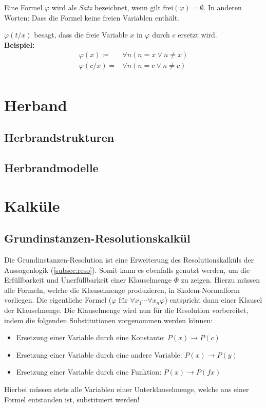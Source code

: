 \begin{description}
			\item[Sätze] Eine Formel $ \varphi $ wird als \textit{Satz} bezeichnet, wenn gilt $ \text{frei}(\varphi) = \emptyset $. In anderen Worten: Dass die Formel keine freien Variablen enthält.
			\item $ \varphi(t / x) $ besagt, dass die freie Variable $ x $ in $ \varphi $ durch $ c $ ersetzt wird. \\
				\textbf{Beispiel:}
				\begin{align*}
					\varphi(x) \coloneqq & \forall n (n = x \lor n \neq x) \\
					\varphi(c / x) =     & \forall n (n = c \lor n \neq c) \\
				\end{align*}
		\end{description}

	\section{Herband}
		\subsection{Herbrandstrukturen}

		\subsection{Herbrandmodelle}

	\section{Kalküle}
		\subsection{Grundinstanzen-Resolutionskalkül}

			Die Grundinstanzen-Resolution ist eine Erweiterung des Resolutionskalküls der Aussagenlogik (\ref{subsec:reso}). Somit kann es ebenfalls genutzt werden, um die Erfüllbarkeit und Unerfüllbarkeit einer Klauselmenge $ \Phi $ zu zeigen. Hierzu müssen alle Formeln, welche die Klauselmenge produzieren, in Skolem-Normalform vorliegen. Die eigentliche Formel ($ \varphi $ für $ \forall x _ 1 \cdots \forall x _ n \varphi $) entspricht dann einer Klausel der Klauselmenge. Die Klauselmenge wird nun für die Resolution vorbereitet, indem die folgenden Substitutionen vorgenommen werden können:
			\begin{itemize}
				\item Ersetzung einer Variable durch eine Konstante: $ P(x) \rightarrow P(c) $
				\item Ersetzung einer Variable durch eine andere Variable: $ P(x) \rightarrow P(y) $
				\item Ersetzung einer Variable durch eine Funktion: $ P(x) \rightarrow P(fx) $
			\end{itemize}
			Hierbei müssen stets alle Variablen einer Unterklauselmenge, welche aus einer Formel entstanden ist, substituiert werden!

